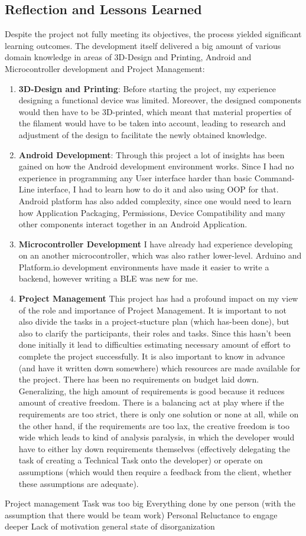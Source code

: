 \subsection{Reflection and Lessons Learned} 
Despite the project not fully meeting its objectives, the process yielded significant learning outcomes. The development itself delivered a big amount of various domain knowledge in areas of 3D-Design and Printing, Android and Microcontroller development and Project Management:
\begin{enumerate}
	\item \textbf{3D-Design and Printing}: Before starting the project, my experience designing a functional device was limited. Moreover, the designed components would then have to be 3D-printed, which meant that material properties of the filament would have to be taken into account, leading to research and adjustment of the design to facilitate the newly obtained knowledge.
	\item \textbf{Android Development}: Through this project a lot of insights has been gained on how the Android development environment works. Since I had no experience in programming any User interface harder than basic Command-Line interface, I had to learn how to do it and also using \ac{OOP} for that. Android platform has also added complexity, since one would need to learn how Application Packaging, Permissions, Device Compatibility and many other components interact together in an Android Application.
	\item \textbf{Microcontroller Development} I have already had experience developing on an another microcontroller, which was also rather lower-level. Arduino and Platform.io development environments have made it easier to write a backend, however writing a \ac{BLE} was new for me. 
	\item \textbf{Project Management} This project has had a profound impact on my view of the role and importance of Project Management. It is important to not also divide the tasks in a project-stucture plan (which has-been done), but also to clarify the participants, their roles and tasks. Since this hasn't been done initially it lead to difficulties estimating necessary amount of effort to complete the project successfully. It is also important to know in advance (and have it written down somewhere) which resources are made available for the project. There has been no requirements on budget laid down. Generalizing, the high amount of requirements is good because it reduces amount of creative freedom. There is a balancing act at play where if the requirements are too strict, there is only one solution or none at all, while on the other hand, if the requirements are too lax, the creative freedom is too wide which leads to kind of analysis paralysis, in which the developer would have to either lay down requirements themselves (effectively delegating the task of creating a Technical Task onto the developer) or operate on assumptions (which would then require a feedback from the client, whether these assumptions are adequate).
\end{enumerate}


Project management
	Task was too big
	Everything done by one person (with the assumption that there would be team work)	
Personal
	Reluctance to engage deeper
	Lack of motivation
	general state of disorganization
